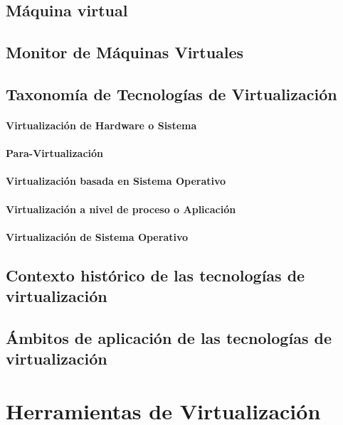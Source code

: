 \section{Máquina virtual}

\section{Monitor de Máquinas Virtuales}

\section{Taxonomía de Tecnologías de Virtualización}

\subsubsection{Virtualización de Hardware o Sistema}
\subsubsection{Para-Virtualización}
\subsubsection{Virtualización basada en Sistema Operativo}
\subsubsection{Virtualización a nivel de proceso o Aplicación}
\subsubsection{Virtualización de Sistema Operativo}

\section{Contexto histórico de las tecnologías de virtualización}

\section{Ámbitos de aplicación de las tecnologías de virtualización}

\chapter{Herramientas de Virtualización}

